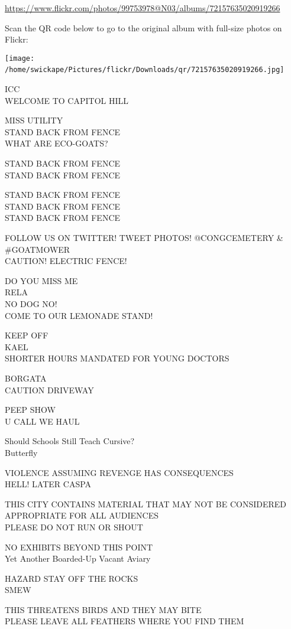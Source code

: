 \documentclass[10pt,letterpaper]{article}
\begin{document}
\url{https://www.flickr.com/photos/99753978@N03/albums/72157635020919266}

Scan the QR code below to go to the original album with full-size photos on Flickr:

\texttt{[image: /home/swickape/Pictures/flickr/Downloads/qr/72157635020919266.jpg]}
\

ICC\\
WELCOME TO CAPITOL HILL

MISS UTILITY\\
STAND BACK FROM FENCE\\
WHAT ARE ECO{-}GOATS?

STAND BACK FROM FENCE\\
STAND BACK FROM FENCE

STAND BACK FROM FENCE\\
STAND BACK FROM FENCE\\
STAND BACK FROM FENCE

FOLLOW US ON TWITTER!  TWEET PHOTOS! @CONGCEMETERY \& \#GOATMOWER\\
CAUTION!  ELECTRIC FENCE!

DO YOU MISS ME\\
RELA\\
NO DOG NO!\\
COME TO OUR LEMONADE STAND!

KEEP OFF\\
KAEL\\
SHORTER HOURS MANDATED FOR YOUNG DOCTORS

BORGATA\\
CAUTION DRIVEWAY

PEEP SHOW\\
U CALL WE HAUL

Should Schools Still Teach Cursive?\\
Butterfly

VIOLENCE ASSUMING REVENGE HAS CONSEQUENCES\\
HELL!  LATER CASPA

THIS CITY CONTAINS MATERIAL THAT MAY NOT BE CONSIDERED APPROPRIATE FOR ALL AUDIENCES\\
PLEASE DO NOT RUN OR SHOUT

NO EXHIBITS BEYOND THIS POINT\\
Yet Another Boarded{-}Up Vacant Aviary

HAZARD STAY OFF THE ROCKS\\
SMEW

THIS THREATENS BIRDS AND THEY MAY BITE\\
PLEASE LEAVE ALL FEATHERS WHERE YOU FIND THEM
\end{document}
